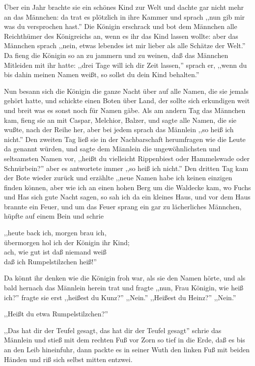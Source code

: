 \documentclass[10pt,a4paper]{article}
\begin{document}
\vskip 4pt
Über ein Jahr brachte sie ein schönes Kind zur Welt und dachte gar nicht mehr an
das Männchen: da trat es plötzlich in ihre Kammer und sprach ,,nun gib mir was
du versprochen hast.'' Die Königin erschrack und bot dem Männchen alle
Reichthümer des Königreichs an, wenn es ihr das Kind lassen wollte: aber das
Männchen sprach ,,nein, etwas lebendes ist mir lieber als alle Schätze der Welt.''
Da fieng die Königin so an zu jammern und zu weinen, daß das Männchen Mitleiden
mit ihr hatte: ,,drei Tage will ich dir Zeit lassen,'' sprach er, ,,wenn du bis
dahin meinen Namen weißt, so sollst du dein Kind behalten.''

\vskip 4pt
Nun besann sich die Königin die ganze Nacht über auf alle Namen, die sie jemals
gehört hatte, und schickte einen Boten über Land, der sollte sich erkundigen
weit und breit was es sonst noch für Namen gäbe. Als am andern Tag das Männchen
kam, fieng sie an mit Caspar, Melchior, Balzer, und sagte alle Namen, die sie
wußte, nach der Reihe her, aber bei jedem sprach das Männlein ,,so heiß ich
nicht.'' Den zweiten Tag ließ sie in der Nachbarschaft herumfragen wie die Leute
da genannt würden, und sagte dem Männlein die ungewöhnlichsten und seltsamsten
Namen vor, ,,heißt du vielleicht Rippenbiest oder Hammelswade oder Schnürbein?''
aber es antwortete immer ,,so heiß ich nicht.'' Den dritten Tag kam der Bote
wieder zurück und erzählte ,,neue Namen habe ich keinen einzigen finden können,
aber wie ich an einen hohen Berg um die Waldecke kam, wo Fuchs und Has sich gute
Nacht sagen, so sah ich da ein kleines Haus, und vor dem Haus brannte ein Feuer,
und um das Feuer sprang ein gar zu lächerliches Männchen, hüpfte auf einem Bein
und schrie

\vskip 4pt
,,heute back ich, morgen brau ich, \\
übermorgen hol ich der Königin ihr Kind; \\
ach, wie gut ist daß niemand weiß \\
daß ich Rumpelstilzchen heiß!''

\vskip 4pt
Da könnt ihr denken wie die Königin froh war, als sie den Namen hörte, und als
bald hernach das Männlein herein trat und fragte ,,nun, Frau Königin, wie heiß
ich?'' fragte sie erst ,,heißest du Kunz?'' ,,Nein.'' ,,Heißest du Heinz?''
,,Nein.''

\vskip 4pt
,,Heißt du etwa Rumpelstilzchen?''

\vskip 4pt
,,Das hat dir der Teufel gesagt, das hat dir der Teufel gesagt'' schrie das
Männlein und stieß mit dem rechten Fuß vor Zorn so tief in die Erde, daß es bis
an den Leib hineinfuhr, dann packte es in seiner Wuth den linken Fuß mit beiden
Händen und riß sich selbst mitten entzwei.
\end{document}
